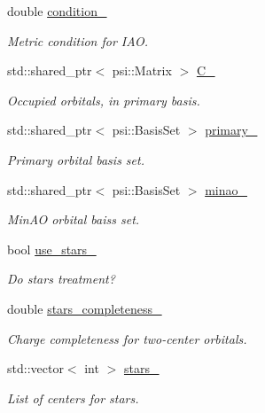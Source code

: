 \begin{DoxyCompactItemize}
double \mbox{\hyperlink{classforte_1_1_i_a_o_builder_aff025f227caea4f6e2eb1691713a0abf}{condition\+\_\+}}
\begin{DoxyCompactList}\small\item\em Metric condition for I\+AO. \end{DoxyCompactList}\item 
std\+::shared\+\_\+ptr$<$ psi\+::\+Matrix $>$ \mbox{\hyperlink{classforte_1_1_i_a_o_builder_a311eda468afbd4f6baf030aa12faa9c2}{C\+\_\+}}
\begin{DoxyCompactList}\small\item\em Occupied orbitals, in primary basis. \end{DoxyCompactList}\item 
std\+::shared\+\_\+ptr$<$ psi\+::\+Basis\+Set $>$ \mbox{\hyperlink{classforte_1_1_i_a_o_builder_afbeb46f36da7e132e691a453e2afda65}{primary\+\_\+}}
\begin{DoxyCompactList}\small\item\em Primary orbital basis set. \end{DoxyCompactList}\item 
std\+::shared\+\_\+ptr$<$ psi\+::\+Basis\+Set $>$ \mbox{\hyperlink{classforte_1_1_i_a_o_builder_a02ab47dd5f555f0351828b7c300be557}{minao\+\_\+}}
\begin{DoxyCompactList}\small\item\em Min\+AO orbital baiss set. \end{DoxyCompactList}\item 
bool \mbox{\hyperlink{classforte_1_1_i_a_o_builder_a4149b7af7932b358a0be0b2c9342427a}{use\+\_\+stars\+\_\+}}
\begin{DoxyCompactList}\small\item\em Do stars treatment? \end{DoxyCompactList}\item 
double \mbox{\hyperlink{classforte_1_1_i_a_o_builder_a3aaf2a2005c2b4c171d3d9f783a9689a}{stars\+\_\+completeness\+\_\+}}
\begin{DoxyCompactList}\small\item\em Charge completeness for two-\/center orbitals. \end{DoxyCompactList}\item 
std\+::vector$<$ int $>$ \mbox{\hyperlink{classforte_1_1_i_a_o_builder_a9837aa54aa70532158d98d9bd9e31bd9}{stars\+\_\+}}
\begin{DoxyCompactList}\small\item\em List of centers for stars. \end{DoxyCompactList}\item 

\end{DoxyCompactItemize}
